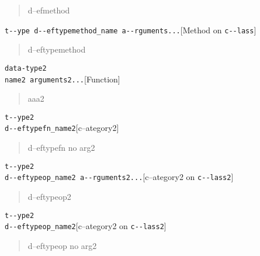 \documentclass{book}
\begin{document}
\begin{titlepage}
%
\begin{quote}
\unskip{\parskip=0pt\noindent}%
d--efmethod
\end{quote}

\noindent\texttt{t{-}{-}ype d{-}{-}eftypemethod\_name a{-}{-}rguments...}\hfill[Method on \texttt{c{-}{-}lass}]



%
\begin{quote}
\unskip{\parskip=0pt\noindent}%
d--eftypemethod
\end{quote}


\noindent\texttt{data-type2\leavevmode{}\\name2 arguments2...}\hfill[Function]



%
\begin{quote}
\unskip{\parskip=0pt\noindent}%
aaa2
\end{quote}

\noindent\texttt{t{-}{-}ype2\leavevmode{}\\d{-}{-}eftypefn\_name2}\hfill[c--ategory2]



%
\begin{quote}
\unskip{\parskip=0pt\noindent}%
d--eftypefn no arg2
\end{quote}

\noindent\texttt{t{-}{-}ype2\leavevmode{}\\d{-}{-}eftypeop\_name2 a{-}{-}rguments2...}\hfill[c--ategory2 on \texttt{c{-}{-}lass2}]



%
\begin{quote}
\unskip{\parskip=0pt\noindent}%
d--eftypeop2
\end{quote}

\noindent\texttt{t{-}{-}ype2\leavevmode{}\\d{-}{-}eftypeop\_name2}\hfill[c--ategory2 on \texttt{c{-}{-}lass2}]



%
\begin{quote}
\unskip{\parskip=0pt\noindent}%
d--eftypeop no arg2
\end{quote}


\end{titlepage}
\end{document}
